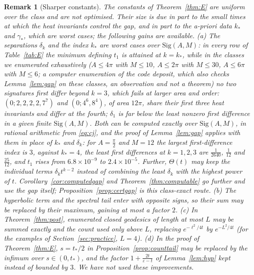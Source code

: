 \documentclass[pdflatex,sn-mathphys-num]{sn-jnl}
\theoremstyle{thmstyleone}%
\theoremstyle{thmstylethree}%
\newtheorem{remark}[theorem]{Remark}%
\newcommand{\Sig}{\mathrm{Sig}}
\begin{document}
\begin{remark}[Sharper constants]\label{rem:sharper}
The constants of Theorem~\ref{thm:E} are uniform over the class and are not optimised. Their size is due in part to the small times at which the heat invariants control the gap, and in part to the a-priori data $k_*$ and $\gamma_*$, which are worst cases; the following gains are available. (a) The separations $\delta_k$ and the index $k_*$ are worst cases over $\Sig(A,M)$: in every row of Table~\ref{tab:E} the minimum defining $t_1$ is attained at $k=k_*$, while in the classes we enumerated exhaustively ($A\le4\pi$ with $M\le10$, $A\le2\pi$ with $M\le30$, $A\le6\pi$ with $M\le6$; a computer enumeration of the code deposit, which also checks Lemma~\ref{lem:gap} on these classes, an observation and not a theorem) no two signatures first differ beyond $k=3$, which fails at larger area and order: $(0;2,2,2,2,7^7)$ and $(0;4^6,8^4)$, of area $12\pi$, share their first three heat invariants and differ at the fourth; $\delta_1$ is far below the least nonzero first difference in a given finite $\Sig(A,M)$. Both can be computed exactly over $\Sig(A,M)$, in rational arithmetic from \eqref{eq:cj}, and the proof of Lemma~\ref{lem:gap} applies with them in place of $k_*$ and $\delta_k$: for $A=\frac\pi2$ and $M=12$ the largest first-difference index is $3$, against $k_*=4$, the least first differences at $k=1,2,3$ are $\frac1{2640}$, $\frac1{12}$ and $\frac{25}{12}$, and $t_1$ rises from $6.8\times10^{-9}$ to $2.4\times10^{-5}$. Further, $\Theta(t)$ may keep the individual terms $\delta_kt^{k-2}$ instead of combining the least $\delta_k$ with the highest power of $t$. Corollary~\ref{cor:computedgap} and Theorem~\ref{thm:computable} go further and use the gap itself; Proposition~\ref{prop:certgap} is this class-exact route. (b) The hyperbolic term and the spectral tail enter with opposite signs, so their sum may be replaced by their maximum, gaining at most a factor $2$. (c) In Theorem~\ref{thm:post}, enumerated closed geodesics of length at most $L$ may be summed exactly and the count used only above $L$, replacing $e^{-\ell^2/4t}$ by $e^{-L^2/4t}$ (for the examples of Section~\ref{sec:practice}, $L=4$). (d) In the proof of Theorem~\ref{thm:E}, $s=t_*/2$ in Proposition~\ref{prop:counttail} may be replaced by the infimum over $s\in(0,t_*)$, and the factor $1+\frac{2t}{\varepsilon-t}$ of Lemma~\ref{lem:hyp} kept instead of bounded by $3$. We have not used these improvements.
\end{remark}
\end{document}
